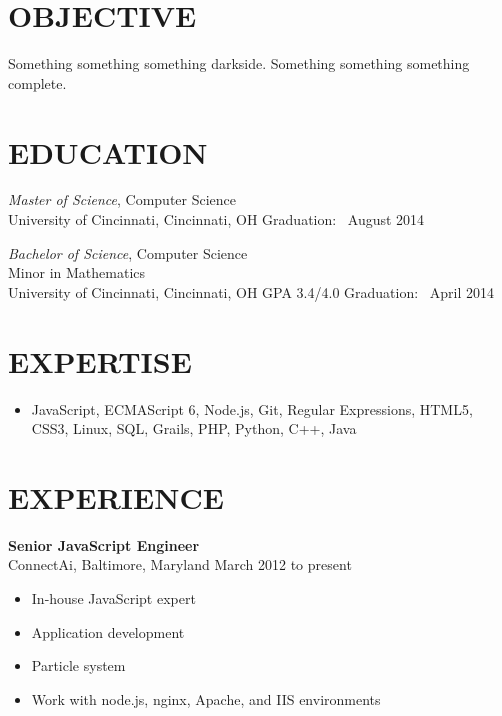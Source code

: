 \documentclass[11pt, line]{res}
\begin{document}
	\address{8228 Melrose Ln\\ Maineville, OH 45039\\ 513-259-0656\\ ross@rhadden.com}

	\begin{resume}
		\section{OBJECTIVE}
			Something something something darkside.  Something something something complete.

		\section{EDUCATION}
				\textit{Master of Science}, Computer Science \\
				University of Cincinnati, Cincinnati, OH
				\hfill
				Graduation: \ August 2014

				\textit{Bachelor of Science}, Computer Science \\
				Minor in Mathematics \\
				University of Cincinnati, Cincinnati, OH
				\hspace{16pt}
				GPA 3.4/4.0
				\hfill
				Graduation: \ April 2014

		\section{EXPERTISE}
			\begin{itemize}[leftmargin=0pt]
				\item[]
					JavaScript,
					ECMAScript 6,
					Node.js,
					Git,
					Regular Expressions,
					HTML5,
					CSS3,
					Linux,
					SQL,
					Grails,
					PHP,
					Python,
					C++,
					Java
			\end{itemize}

		\section{EXPERIENCE}
				\textbf{Senior JavaScript Engineer} \\
				ConnectAi,\; Baltimore, Maryland
				\hfill March 2012 to present \

				\begin{itemize}
					\item In-house JavaScript expert
					\item Application development
					\item Particle system
					\item Work with node.js, nginx, Apache, and IIS environments
				\end{itemize}


\end{resume}
\end{document}
